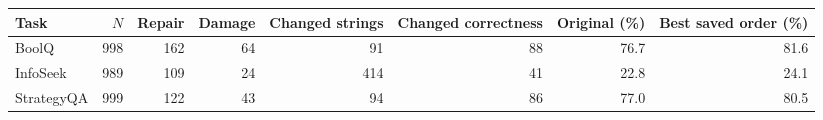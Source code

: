 \begin{tabular}{lrrrrrrr}
\toprule
Task & $N$ & Repair & Damage & Changed strings & Changed correctness & Original (\%) & Best saved order (\%) \\
\midrule
BoolQ & 998 & 162 & 64 & 91 & 88 & 76.7 & 81.6 \\
InfoSeek & 989 & 109 & 24 & 414 & 41 & 22.8 & 24.1 \\
StrategyQA & 999 & 122 & 43 & 94 & 86 & 77.0 & 80.5 \\
\bottomrule
\end{tabular}
